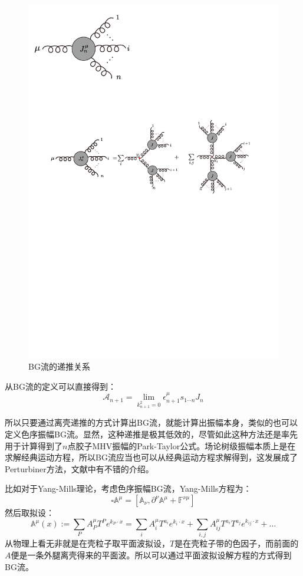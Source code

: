 \begin{figure}[htbp]
	\centering
	\includegraphics[width=\linewidth]{figs/fig14.pdf}
	\caption{BG流的递推关系}
	\label{fig:6.7}
\end{figure}
从BG流的定义可以直接得到：
\begin{equation}
	\mathcal{A}_{n+1} =\lim_{k^2_{n+1}=0} \epsilon^\mu_{n+1}s_{1\cdots n}J_n
\end{equation}

所以只要通过离壳递推的方式计算出BG流，就能计算出振幅本身，类似的也可以定义色序振幅BG流。显然，这种递推是极其低效的，尽管如此这种方法还是率先用于计算得到了$n$点胶子MHV振幅的Park-Taylor公式\cite{Dixon:1996wi,Mangano:1990by}。场论树级振幅本质上是在求解经典运动方程，所以BG流应当也可以从经典运动方程求解得到，这发展成了Perturbiner方法，文献\cite{Mizera:2018jbh}中有不错的介绍。

比如对于Yang-Mills理论，考虑色序振幅BG流，Yang-Mills方程为：
\begin{equation}
	\square\mathbb{A}^{\mu}=[\mathbb{A}_{\nu},\partial^{\nu}\mathbb{A}^{\mu}+\mathbb{F}^{\nu\mu}]
\end{equation}
然后取拟设：
\begin{equation}
	\mathbb{A}^\mu(x):=\sum_PA_P^\mu T^Pe^{k_P\cdot x}=\sum_iA_i^\mu T^{a_i}e^{k_i\cdot x}+\sum_{i,j}A_{ij}^\mu T^{a_i}T^{a_j}e^{k_{ij}\cdot x}+\ldots
\end{equation}
从物理上看无非就是在壳粒子取平面波拟设，$T$是在壳粒子带的色因子，而前面的$A$便是一条外腿离壳得来的平面波。所以可以通过平面波拟设解方程的方式得到BG流。

